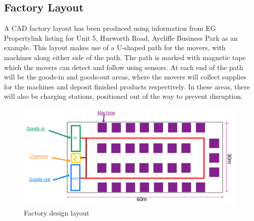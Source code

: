 \documentclass[12pt,titlepage]{article}
\begin{document}
\subsection{Factory Layout}
 A CAD factory layout has been produced using information from EG Propertylink listing for Unit 5, Hurworth Road, Aycliffe Business Park \cite{mileway_hurworth_2024} as an example. This layout makes use of a U-shaped path for the movers, with machines along either side of the path. The path is marked with magnetic tape which the movers can detect and follow using sensors. At each end of the path will be the goods-in and goods-out areas, where the movers will collect supplies for the machines and deposit finished products respectively. In these areas, there will also be charging stations, positioned out of the way to prevent disruption.
 \FloatBarrier
\begin{figure}[ht]
    \centering
    \begin{minipage}[t]{1\textwidth}
    \vspace{-5pt}
        \centering
        \includegraphics[width=1\linewidth]{Factory Layout Louis Big Text.png}
        \vspace{-5pt}
        \caption{Factory design layout}
        \label{fig:factory_layout}
    \end{minipage}
\end{figure}

\FloatBarrier
 
\newpage
 
\end{document}
